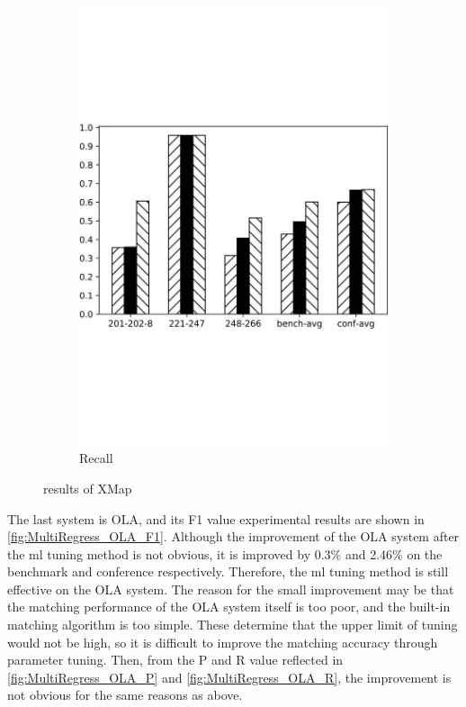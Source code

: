 \documentclass[twoside]{article}
\begin{document}
\begin{figure}[htb!]
\begin{subfigure}{0.3\textwidth}
\includegraphics[width=\textwidth]{data_figs/MulRegress_XMap_R.pdf}
\caption{Recall}
\label{fig:MultiRegress_XMap_R}
\end{subfigure}
\caption{results of XMap}
\end{figure}

The last system is OLA, and its F1 value experimental results are shown in \ref{fig:MultiRegress_OLA_F1}.
Although the improvement of the OLA system after the ml tuning method is not obvious, it is improved by 0.3\% and 2.46\% on the benchmark and conference respectively. Therefore, the ml tuning method is still effective on the OLA system.
The reason for the small improvement may be that the matching performance of the OLA system itself is too poor, and the built-in matching algorithm is too simple. These determine that the upper limit of tuning would not be high, so it is difficult to improve the matching accuracy through parameter tuning.
Then, from the P and R value reflected in \ref{fig:MultiRegress_OLA_P} and \ref{fig:MultiRegress_OLA_R}, the improvement is not obvious for the same reasons as above.
\end{document}
